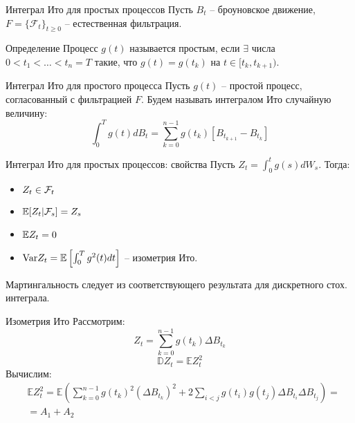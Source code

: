 \documentclass{beamer}
\begin{document}
\begin{frame}{Интеграл Ито для простых процессов}
    Пусть $B_t$ -- броуновское движение, $F=\{\mathcal{F} _t\}_{t\geq 0}$ -- естественная фильтрация.

    \begin{block}{Определение}
        Процесс $g(t)$ называется простым, если $\exists$ числа $0 < t_1 < \ldots < t_n = T$ такие, что $g(t) = g(t_k)$ на $t \in [t_k, t_{k+1})$.
    \end{block}
     
    
    \begin{block}{Интеграл Ито для простого процесса}
        Пусть $g(t)$ -- простой процесс, согласованный с фильтрацией $F$. Будем называть интегралом Ито случайную величину:
        $$
            \int_0^T g(t) dB_t = \sum_{k=0}^{n-1} g(t_k)\left[B_{t_{k+1}} - B_{t_k}\right]
        $$
    \end{block}    
\end{frame}

\begin{frame}{Интеграл Ито для простых процессов: свойства}
    Пусть $Z_t = \int_0^t g(s) dW_s$. Тогда:
    \begin{itemize}
        \item $Z_t \in \mathcal{F}_t$
        \item $\mathbb{E} [Z_t | \mathcal{F}_s] = Z_s$
        \item $\mathbb{E} Z_t = 0$
        \item $\mathrm{Var} Z_t = \mathbb{E} \left[ \int_0^T g^2(t) dt \right] $ -- изометрия Ито.
    \end{itemize}
    Мартингальность следует из соответствующего результата для дискретного стох. интеграла. 
\end{frame}

\begin{frame}{Изометрия Ито}
    Рассмотрим:
    $$
        Z_t = \sum_{k=0}^{n-1} g(t_k) \Delta B_{t_k}
    $$
    $$
        \mathbb{D} Z_t = \mathbb{E} Z_t^2
    $$
    Вычислим:
    \begin{align*}
        &\mathbb{E} Z_t^2 = \mathbb{E} \left(\sum_{k=0}^{n-1} g(t_k)^2 \left(\Delta B_{t_k}\right)^2 + 2 \sum_{i < j} g(t_i)g(t_j) \Delta B_{t_i} \Delta B_{t_j}\right) = \\
        &= A_1 + A_2
    \end{align*}
\end{frame}
\end{document}
